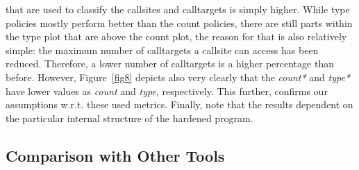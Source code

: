 that are used to classify the callsites and calltargets is simply higher. While type policies mostly 
perform better than the count policies, there are still parts within the type plot that are above the 
count plot, the reason for that is also relatively simple: the maximum number of calltargets a 
callsite can access has been reduced. Therefore, a lower number of calltargets is a higher 
percentage than before. However, Figure~\ref{fig8} depicts also very clearly
that the \textit{count*} and \textit{type*} have lower values as 
\textit{count} and \textit{type}, respectively. This further, confirms our assumptions 
w.r.t. these used metrics. Finally, note that the results dependent on the particular 
internal structure of the hardened program.


\subsection{Comparison with Other Tools}
\label{RQ5: Is TypeShield better than other tools?}
\vspace{-.15cm}
\begin{table}[h]
	\caption {Medians of calltargets per callsite for different tools.} 
	\label{tbl:toolcompare}
	\vspace{-.5cm}
\end{table}

